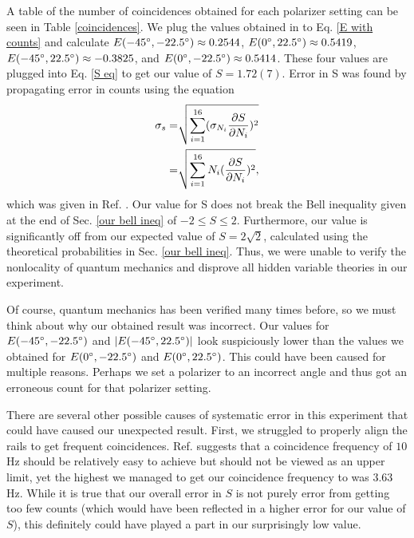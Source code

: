 \documentclass[11pt,letterpaper]{article}
\begin{document}
A table of the number of coincidences obtained for each polarizer setting can be seen in Table \ref{coincidences}. We plug the values obtained in to Eq. \ref{E with counts} and calculate $E(-45\degree, -22.5\degree) \approx 0.2544$, $E(0\degree, 22.5\degree) \approx 0.5419$, $E(-45\degree, 22.5\degree) \approx -0.3825$, and $E(0\degree, -22.5\degree) \approx 0.5414$. These four values are plugged into Eq. \ref{S eq} to get our value of $S = 1.72(7)$. Error in S was found by propagating error in counts using the equation
\begin{align}
    \sigma_s = & \sqrt{\sum_{i=1}^{16}(\sigma_{N_i} {\partial S \over \partial N_i})^2} \\
    = & \sqrt{\sum_{i=1}^{16} N_i ({\partial S \over \partial N_i})^2} ,
\end{align}
which was given in Ref. \cite{Dehlinger}. Our value for S does not break the Bell inequality given at the end of Sec. \ref{our bell ineq} of $-2 \le S \le 2$. Furthermore, our value is significantly off from our expected value of $S = 2\sqrt{2}$, calculated using the theoretical probabilities in Sec. \ref{our bell ineq}. Thus, we were unable to verify the nonlocality of quantum mechanics and disprove all hidden variable theories in our experiment.

Of course, quantum mechanics has been verified many times before, so we must think about why our obtained result was incorrect. Our values for $E(-45\degree, -22.5\degree)$ and $|E(-45\degree, 22.5\degree)|$ look suspiciously lower than the values we obtained for $E(0\degree, -22.5\degree)$ and $E(0\degree, 22.5\degree)$. This could have been caused for multiple reasons. Perhaps we set a polarizer to an incorrect angle and thus got an erroneous count for that polarizer setting. 

There are several other possible causes of systematic error in this experiment that could have caused our unexpected result. First, we struggled to properly align the rails to get frequent coincidences. Ref. \cite{Lab manual} suggests that a coincidence frequency of $10$ Hz should be relatively easy to achieve but should not be viewed as an upper limit, yet the highest we managed to get our coincidence frequency to was $3.63$ Hz. While it is true that our overall error in $S$ is not purely error from getting too few counts (which would have been reflected in a higher error for our value of $S$), this definitely could have played a part in our surprisingly low value.
\end{document}
